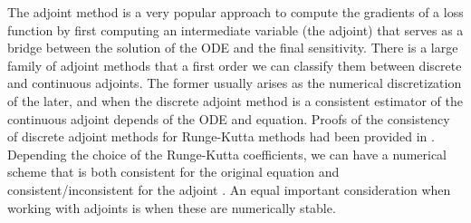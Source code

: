 The adjoint method is a very popular approach to compute the gradients of a loss function by first computing an intermediate variable (the adjoint) that serves as a bridge between the solution of the ODE and the final sensitivity. 
There is a large family of adjoint methods that a first order we can classify them between discrete and continuous adjoints. 
The former usually arises as the numerical discretization of the later, and when the discrete adjoint method is a consistent estimator of the continuous adjoint depends of the ODE and equation.  
Proofs of the consistency of discrete adjoint methods for Runge-Kutta methods had been provided in \cite{sandu2006properties, sandu2011solution}.
Depending the choice of the Runge-Kutta coefficients, we can have a numerical scheme that is both consistent for the original equation and consistent/inconsistent for the adjoint \cite{Hager_2000}.
An equal important consideration when working with adjoints is when these are numerically stable. 